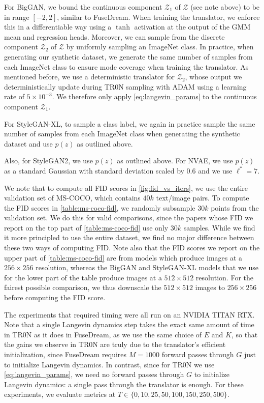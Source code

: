 \documentclass[nohyperref]{article}
\theoremstyle{plain}
\theoremstyle{definition}
\theoremstyle{remark}
\begin{document}
For BigGAN, we bound the continuous component $\mathcal{Z}_1$ of $\mathcal{Z}$ (see note above) to be in range $[-2,2]$, similar to FuseDream. When training the translator, we enforce this in a differentiable way using a $\tanh$ activation at the output of the GMM mean and regression heads. Moreover, we can sample from the discrete component $\mathcal{Z}_2$ of $\mathcal{Z}$ by uniformly sampling an ImageNet class. In practice, when generating our synthetic dataset, we generate the same number of samples from each ImageNet class to ensure mode coverage when training the translator. As mentioned before, we use a deterministic translator for $\mathcal{Z}_2$, whose output we deterministically update during TR0N sampling with ADAM using a learning rate of $5 \times 10^{-3}$. We therefore only apply \eqref{eq:langevin_params} to the continuous component $\mathcal{Z}_1$.

For StyleGAN-XL, to sample a class label, we again in practice sample the same number of samples from each ImageNet class when generating the synthetic dataset and use $p(z)$ as outlined above.

Also, for StyleGAN2, we use $p(z)$ as outlined above. For NVAE, we use $p(z)$ as a standard Gaussian with standard deviation scaled by $0.6$ and we use $\ell^{*}=7$.

We note that to compute all FID scores in \autoref{fig:fid_vs_iters}, we use the entire validation set of MS-COCO, which contains $40k$ text/image pairs. To compute the FID scores in \autoref{table:ms-coco-fid}, we randomly subsample $30k$ points from the validation set. We do this for valid comparisons, since the papers whose FID we report on the top part of \autoref{table:ms-coco-fid} use only $30k$ samples. While we find it more principled to use the entire dataset, we find no major difference between these two ways of computing FID. Note also that the FID scores we report on the upper part of \autoref{table:ms-coco-fid} are from models which produce images at a $256 \times 256$ resolution, whereas the BigGAN and StyleGAN-XL models that we use for the lower part of the table produce images at a $512 \times 512$ resolution. For the fairest possible comparison, we thus downscale the $512 \times 512$ images to $256 \times 256$ before computing the FID score.

The experiments that required timing were all run on an NVIDIA TITAN RTX. Note that a single Langevin dynamics step takes the exact same amount of time in TR0N as it does in FuseDream, as we use the same choice of $E$ and $K$, so that the gains we observe in TR0N are truly due to the translator's efficient initialization, since FuseDream requires $M=1000$ forward passes through $G$ just to initialize Langevin dynamics. In contrast, since for TR0N we use \eqref{eq:langevin_params}, we need no forward passes through $G$ to initialize Langevin dynamics: a single pass through the translator is enough. For these experiments, we evaluate metrics at $T \in \{0, 10, 25, 50, 100, 150, 250, 500\}$.
\end{document}
